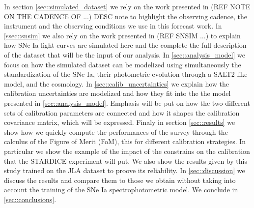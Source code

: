 \documentclass[\docopts]{\docclass}
\begin{document}
In section \ref{sec::simulated_dataset} we rely on the work presented in (REF NOTE ON THE CADENCE OF ...) DESC note to highlight the observing cadence, the instrument and the observing conditions we use in this forecast work.
In \ref{ssec::snsim} we also rely on the work presented in (REF SNSIM ...) to explain how SNe Ia light curves are simulated here and the complete the full description of the dataset that will be the input of our analysis.
In \ref{sec::analysis_model} we focus on how the simulated dataset can be modelized using simultaneously the standardization of the SNe Ia, their photometric evolution through a SALT2-like model, and the cosmology.
In \ref{sec::calib_uncertainties} we explain how the calibration uncertainties are modelized and how they fit into the the model presented in \ref{sec::analysis_model}.
Emphasis will be put on how the two different sets of calibration parameters are connected and how it shapes the calibration covariance matrix, which will be expressed.
Finaly in section \ref{sec::results} we show how we quickly compute the performances of the survey through the calculus of the Figure of Merit (FoM), this for different calibration strategies.
In particular we show the example of the impact of the constrains on the calibration that the STARDICE experiment will put.
We also show the results given by this study trained on the JLA dataset to proove its reliability.
In \ref{sec::discussion} we discuss the results and compare them to those we obtain without taking into account the training of the SNe Ia spectrophotometric model.
We conclude in \ref{sec::conclusions}.


\end{document}
